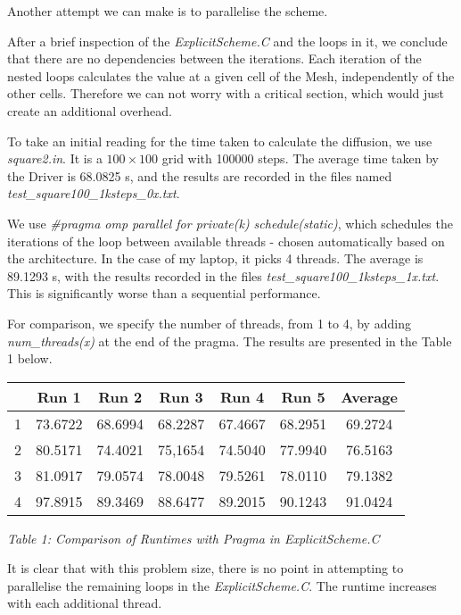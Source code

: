 \documentclass[11pt,journal]{IEEEtran}
\begin{document}
	
	
	Another attempt we can make is to parallelise the scheme.
	
	After a brief inspection of the \emph{ExplicitScheme.C} and the loops in it, we conclude that there are no dependencies between the iterations. Each iteration of the nested loops calculates the value at a given cell of the Mesh, independently of the other cells. Therefore we can not worry with a critical section, which would just create an additional overhead. 
	
	To take an initial reading for the time taken to calculate the diffusion, we use \emph{square2.in}. It is a $100 \times 100$ grid with 100000 steps. The average time taken by the Driver is 68.0825 s, and the results are recorded in the files named \emph{test\_square100\_1ksteps\_0x.txt}.
	
	We use \emph{\#pragma omp parallel for private(k) schedule(static)}, which schedules the iterations of the loop between available threads - chosen automatically based on the architecture. In the case of my laptop, it picks 4 threads. The average is 89.1293 s, with the results recorded in the files \emph{test\_square100\_1ksteps\_1x.txt}. This is significantly worse than a sequential performance. 
	
	For comparison, we specify the number of threads, from 1 to 4, by adding \emph{num\_threads(x)} at the end of the pragma. The results are presented in the Table 1 below. 
	\begin{table}[h]
		\centering
	\begin{tabular}{|c||c|c|c|c|c||c|}
		\hline 
		 & Run 1  & Run 2  & Run 3  & Run 4  & Run 5  & Average  \\ 
		\hline 
		1 & 73.6722  & 68.6994  & 68.2287  & 67.4667  & 68.2951  & 69.2724  \\ 
		\hline 
		2 & 80.5171  & 74.4021  & 75,1654  & 74.5040  & 77.9940  & 76.5163  \\ 
		\hline 
		3& 81.0917  & 79.0574  & 78.0048  & 79.5261  & 78.0110  & 79.1382  \\ 
		\hline 
		4& 97.8915 & 89.3469 & 88.6477 & 89.2015 & 90.1243 & 91.0424 \\ 
		\hline 
	\end{tabular} 
\emph{Table 1: Comparison of Runtimes with Pragma in ExplicitScheme.C}
\end{table}
	
	It is clear that with this problem size, there is no point in attempting to parallelise the remaining loops in the \emph{ExplicitScheme.C}. The runtime increases with each additional thread. 
	
\end{document}
